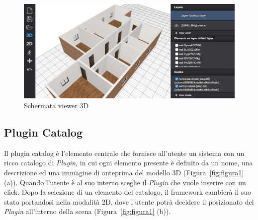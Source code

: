\begin{figure}[htbp] %
   \centering
   \includegraphics[width=1\linewidth]{images/3d}
   \caption{Schermata viewer 3D }
   \label{fig:viewer3D}
\end{figure}
\newpage

\subsection{Plugin Catalog}
\label{sec:chapter_2_section_2_sub_3}

\noindent
 Il plugin catalog \`e l'elemento centrale che fornisce all'utente un sistema con un ricco catalogo di \emph{Plugin},
 in cui ogni elemento presente \`e definito da un nome, una descrizione ed una
 immagine di anteprima del modello 3D (Figura~\ref{fig:figura1} (a)). Quando l'utente \`e al suo interno
 sceglie il \emph{Plugin} che vuole inserire con un click.
 Dopo la selezione di un elemento del catalogo, il framework cambierà il suo stato portandosi nella modalit\`a 2D,
 dove l'utente potrà decidere il posizionato del \emph{Plugin} all'interno della scena (Figura~\ref{fig:figura1} (b)).

